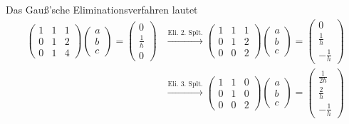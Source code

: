 \documentclass{exercise}
\begin{document}
    Das Gauß'sche Eliminationsverfahren lautet
    \begin{align*}
        \begin{pmatrix}
            1 & 1 & 1\\
            0 & 1 & 2\\
            0 & 1 & 4
        \end{pmatrix}\begin{pmatrix}
            a\\
            b\\
            c
        \end{pmatrix} = \begin{pmatrix}
            0\\
            \frac{1}{h}\\
            0
        \end{pmatrix} &\xrightarrow{\text{Eli. 2. Splt.}} \begin{pmatrix}
            1 & 1 & 1\\
            0 & 1 & 2\\
            0 & 0 & 2
        \end{pmatrix}\begin{pmatrix}
            a\\
            b\\
            c
        \end{pmatrix} = \begin{pmatrix}
            0\\
            \frac{1}{h}\\
            -\frac{1}{h}
        \end{pmatrix}\\
        &\xrightarrow{\text{Eli. 3. Splt.}} \begin{pmatrix}
            1 & 1 & 0\\
            0 & 1 & 0\\
            0 & 0 & 2
        \end{pmatrix}\begin{pmatrix}
            a\\
            b\\
            c
        \end{pmatrix} = \begin{pmatrix}
            \frac{1}{2h}\\
            \frac{2}{h}\\
            -\frac{1}{h}
        \end{pmatrix}\\

\end{align*}
\end{document}
